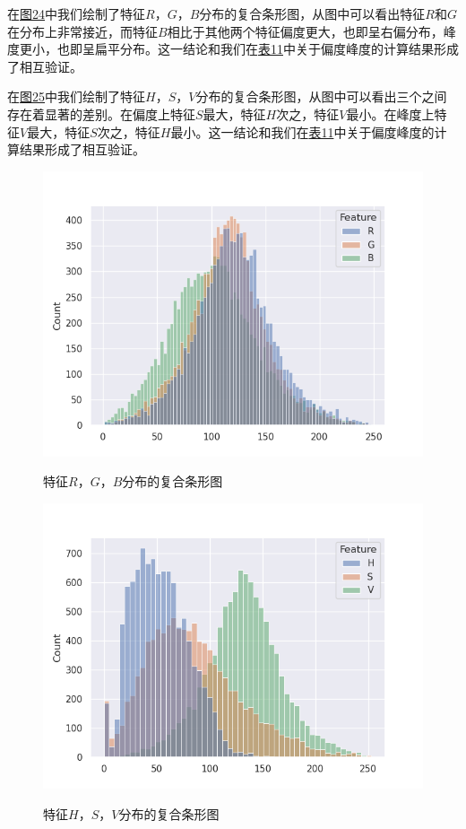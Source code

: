 \documentclass[UTF8]{ctexart}
\begin{document}
	在\hyperref[Fig.24]{图24}中我们绘制了特征$R$，$G$，$B$分布的复合条形图，从图中可以看出特征$R$和$G$在分布上非常接近，而特征$B$相比于其他两个特征偏度更大，也即呈右偏分布，峰度更小，也即呈扁平分布。这一结论和我们在\hyperref[Chart.11]{表11}中关于偏度峰度的计算结果形成了相互验证。
	
	在\hyperref[Fig.25]{图25}中我们绘制了特征$H$，$S$，$V$分布的复合条形图，从图中可以看出三个之间存在着显著的差别。在偏度上特征$S$最大，特征$H$次之，特征$V$最小。在峰度上特征$V$最大，特征$S$次之，特征$H$最小。这一结论和我们在\hyperref[Chart.11]{表11}中关于偏度峰度的计算结果形成了相互验证。
	
	\begin{figure}[htbp]
		\centering
		\caption{特征$R$，$G$，$B$分布的复合条形图}
		\includegraphics[width=1.0\textwidth]{hist_r_g_b.png}
		\label{Fig.24}
	\end{figure}
	
	\begin{figure}[htbp]
		\centering
		\caption{特征$H$，$S$，$V$分布的复合条形图}
		\includegraphics[width=1.0\textwidth]{hist_h_s_v.png}
		\label{Fig.25}
	\end{figure}
	
\end{document}

